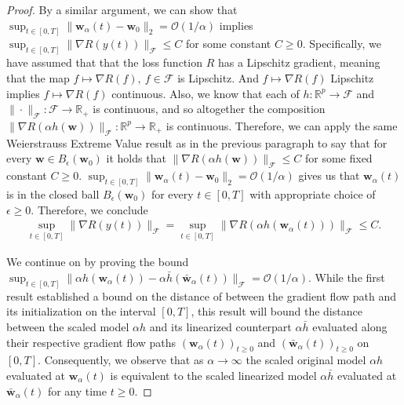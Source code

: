 \documentclass{article}
\begin{document}
\begin{proof}
By a similar argument, we can show that $\sup_{t \in [0, T]} \|\boldsymbol{w}_{\alpha}(t) - \boldsymbol{w}_0 \|_2 = \mathcal{O}(1/ \alpha)$ implies $\sup_{t \in [0, T]} \| \nabla R(y(t))\|_{\mathcal{F}}\leq C$ for some constant $C \geq 0$. Specifically, we have assumed that that the loss function $R$ has a Lipschitz gradient, meaning that the map $f \mapsto \nabla R(f), \ f \in \mathcal{F}$ is Lipschitz. And $f \mapsto \nabla R(f)$ Lipschitz implies $f \mapsto \nabla R(f)$ continuous. Also, we know that each of $h: \mathbb{R}^p \rightarrow \mathcal{F}$ and $\| \cdot \|_{\mathcal{F}}: \mathcal{F} \rightarrow \mathbb{R}_+$ is continuous, and so altogether the composition $\|\nabla R(\alpha h(\boldsymbol{w}))\|_{\mathcal{F}}: \mathbb{R}^p \rightarrow \mathbb{R}_+$ is continuous. Therefore, we can apply the same  Weierstrauss Extreme Value result as in the previous paragraph to say that for every $\boldsymbol{w} \in B_{\epsilon}(\boldsymbol{w}_0)$ it holds that $\|\nabla R(\alpha h(\boldsymbol{w}))\|_{\mathcal{F}} \leq C$ for some fixed constant $C \geq 0$. $\sup_{t \in [0, T]} \|\boldsymbol{w}_{\alpha}(t) - \boldsymbol{w}_0 \|_2 = \mathcal{O}(1/\alpha)$ gives us that $\boldsymbol{w}_{\alpha}(t)$ is in the closed ball $B_{\epsilon}(\boldsymbol{w}_0)$ for every $t \in [0, T]$ with appropriate choice of $\epsilon \geq 0$. Therefore, we conclude
\begin{align*}
    \sup_{t \in [0, T]} \| \nabla R(y(t))\|_{\mathcal{F}} = \sup_{t \in [0, T]} \| \nabla R(\alpha h(\boldsymbol{w}_{\alpha}(t)))\|_{\mathcal{F}} \leq C.
\end{align*}

We continue on by proving the bound $\sup_{t \in [0, T]} \| \alpha h(\boldsymbol{w}_{\alpha}(t)) - \alpha \bar{h}(\boldsymbol{\bar{w}}_{\alpha}(t)) \|_{\mathcal{F}} = \mathcal{O}(1/\alpha).$ While the first result established a bound on the distance of between the gradient flow path and its initialization on the interval $[0, T]$, this result will bound the distance between the scaled model $\alpha h$ and its linearized counterpart $\alpha \bar{h}$ evaluated along their respective gradient flow paths $(\boldsymbol{w}_{\alpha}(t))_{t \geq 0}$ and $(\boldsymbol{\bar{w}}_{\alpha}(t))_{t \geq 0}$ on $[0, T]$. Consequently, we observe that as $\alpha \rightarrow \infty$ the scaled original model $\alpha h$ evaluated at $\boldsymbol{w}_{\alpha}(t)$ is equivalent to the scaled linearized model $\alpha \bar{h}$ evaluated at $\boldsymbol{\bar{w}}_{\alpha}(t)$ for any time $t \geq 0$.


\end{proof}
\end{document}
